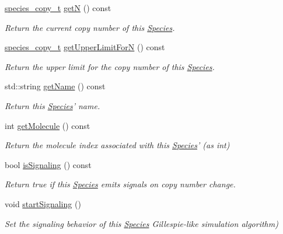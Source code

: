 \begin{DoxyCompactItemize}
\hyperlink{common_8h_a3503f321fd36304ee274141275cca586}{species\-\_\-copy\-\_\-t} \hyperlink{classchem_1_1Species_af7c9f51060b84169b428a7796dad6dca}{get\-N} () const 
\begin{DoxyCompactList}\small\item\em Return the current copy number of this \hyperlink{classchem_1_1Species}{Species}. \end{DoxyCompactList}\item 
\hyperlink{common_8h_a3503f321fd36304ee274141275cca586}{species\-\_\-copy\-\_\-t} \hyperlink{classchem_1_1Species_a05fbe0a05f028beb1bb729f19d44a56a}{get\-Upper\-Limit\-For\-N} () const 
\begin{DoxyCompactList}\small\item\em Return the upper limit for the copy number of this \hyperlink{classchem_1_1Species}{Species}. \end{DoxyCompactList}\item 
std\-::string \hyperlink{classchem_1_1Species_aa32c8f7fb344c68539a927c6a7f916c7}{get\-Name} () const 
\begin{DoxyCompactList}\small\item\em Return this \hyperlink{classchem_1_1Species}{Species}' name. \end{DoxyCompactList}\item 
int \hyperlink{classchem_1_1Species_a330ef4514a8979a6ea0e6f71ed5cb820}{get\-Molecule} () const 
\begin{DoxyCompactList}\small\item\em Return the molecule index associated with this \hyperlink{classchem_1_1Species}{Species}' (as int) \end{DoxyCompactList}\item 
bool \hyperlink{classchem_1_1Species_aa412f592e88600b48e3df591fc4cd655}{is\-Signaling} () const 
\begin{DoxyCompactList}\small\item\em Return true if this \hyperlink{classchem_1_1Species}{Species} emits signals on copy number change. \end{DoxyCompactList}\item 
void \hyperlink{classchem_1_1Species_a2d3d9f6e7c7d9c7bdd87ff5373a7d08c}{start\-Signaling} ()
\begin{DoxyCompactList}\small\item\em Set the signaling behavior of this \hyperlink{classchem_1_1Species}{Species} Gillespie-\/like simulation algorithm) \end{DoxyCompactList}\item 

\end{DoxyCompactItemize}
